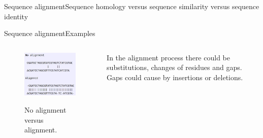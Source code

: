 \documentclass[10pt]{beamer}
\begin{document}
{\begin{frame}{Sequence alignment}{Sequence homology versus sequence similarity versus sequence identity}
\begin{itemize}
\end{itemize}
\end{frame}


\begin{frame}{Sequence alignment}{Examples}
\begin{columns}
	\begin{column}{0.48\textwidth}
		\begin{figure}[]
			\centering
			\includegraphics[width=\textwidth,height=0.6\textheight,keepaspectratio]{img/alignment/al1.jpg}
			\label{img:alig}
			\caption{No alignment versus alignment.}
		\end{figure}
	\end{column}
	\begin{column}{0.48\textwidth}
		In the alignment process there could be substitutions, changes of residues and gaps. Gaps could cause by insertions or deletions.
	\end{column}
\end{columns}
\end{frame}

}
\end{document}
